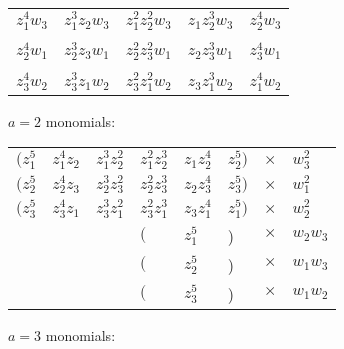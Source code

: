 \documentclass{article}
\begin{document}
	\begin{table}[]
		\begin{tabular}{lllll}
			$z_{1}^{4} w_{3}$ & $z_{1}^{3} z_{2} w_{3}$ & $z_{1}^{2} z_{2}^{2} w_{3}$ & $z_{1} z_{2}^{3} w_{3}$ & $z_{2}^{4}w_{3}$ \\
			&                       &                           &                       &                  \\
			$z_{2}^{4} w_{1}$ & $z_{2}^{3} z_{3} w_{1}$ & $z_{2}^{2} z_{3}^{2} w_{1}$ & $z_{2} z_{3}^{3} w_{1}$ & $z_{3}^{4}w_{1}$ \\
			&                       &                           &                       &                  \\
			$z_{3}^{4} w_{2}$ & $z_{3}^{3} z_{1} w_{2}$ & $z_{3}^{2} z_{1}^{2} w_{2}$ & $z_{3} z_{1}^{3} w_{2}$ & $z_{1}^{4}w_{2}$            
		\end{tabular}
	\end{table}


	$a = 2$ monomials:
	
	\begin{table}[]
		\begin{tabular}{lllllll}
			$\bigg(z_{1}^{5}$ & $z_{1}^{4}z_{2}$ & $z_{1}^{3}z_{2}^{2}$ & $z_{1}^{2}z_{2}^{3}$ & $z_{1}z_{2}^{4}$ & $z_{2}^{5} \bigg)$ & $\times \quad w_{3}^{2}$ \\
			$\bigg(z_{2}^{5}$ & $z_{2}^{4}z_{3}$ & $z_{2}^{3}z_{3}^{2}$ & $z_{2}^{2}z_{3}^{3}$ & $z_{2}z_{3}^{4}$ & $z_{3}^{5} \bigg)$ & $\times \quad w_{1}^{2}$ \\
			$\bigg(z_{3}^{5}$ & $z_{3}^{4}z_{1}$ & $z_{3}^{3}z_{1}^{2}$ & $z_{3}^{2}z_{1}^{3}$ & $z_{3}z_{1}^{4}$ & $z_{1}^{5} \bigg)$ & $\times \quad w_{2}^{2}$ \\
			& & & $\big($ & $z_{1}^{5}$ & \big)& $\times \quad w_{2}w_{3}$ \\
			& & & $\big($ & $z_{2}^{5}$ & \big)& $\times \quad w_{1}w_{3}$ \\
			& & & $\big($ & $z_{3}^{5}$ & \big)& $\times \quad w_{1}w_{2}$ \\              
		\end{tabular}
	\end{table}

	$a = 3$ monomials:
\end{document}

